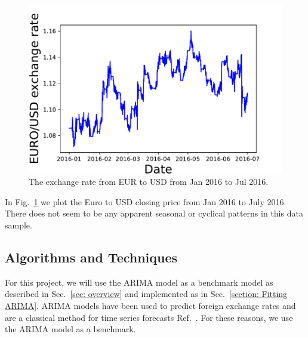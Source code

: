 \documentclass[10pt,a4paper]{article}
\begin{document}
\begin{figure}[h]
\begin{center}
\includegraphics[scale=0.4]{EURO_USD_exchange_rate.pdf}
\caption{The exchange rate from EUR to USD from Jan 2016 to Jul 2016.}
\label{fig:EURUSD example2}
\centering
\end{center}
\end{figure}

In Fig.~\ref{fig:EURUSD example2} we plot the Euro to USD closing price from Jan 2016 to July 2016. There does not seem to be any apparent seasonal or cyclical patterns in this data sample.


\subsection{Algorithms and Techniques}
%
For this project, we will use the ARIMA model as a benchmark model as described in Sec.~\ref{sec: overview} and implemented as in Sec.~\ref{section: Fitting ARIMA}. ARIMA models have been used to predict foreign exchange rates \cite{Mong_2016} and are a classical method for time series forecasts Ref.~\cite{Adhikari_2013}. For these reasons, we use the ARIMA model as a benchmark.
\end{document}

